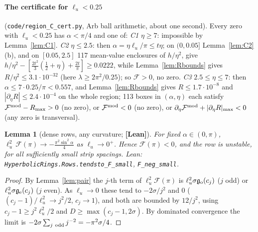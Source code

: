 \documentclass[11pt]{article}
\newtheorem{lemma}[theorem]{Lemma}
\theoremstyle{definition}
\theoremstyle{remark}
\newcommand{\st}[1]{\textbf{[#1]}}
\newcommand{\lean}[1]{\nolinkurl{#1}}
\begin{document}
\paragraph{The certificate for $\ell_u<0.25$} (\nolinkurl{code/region_C_cert.py}, Arb ball arithmetic, about one second). Every zero
with $\ell_u<0.25$ has $\alpha<\pi/4$ and one of: \emph{C1} $\eta\ge7$: impossible by Lemma~\ref{lem:C1}. \emph{C2} $\eta\le2.5$: then
$\alpha=\eta\ell_u/\pi\le t\eta$; on $(0,0.05]$ Lemma~\ref{lem:C2}(b), and on $[0.05,2.5]$ 117 mean-value enclosures of $h/\eta^2$, give
$h/\eta^2-[\frac{2t^2}3(\frac12+\eta)+\frac{2t}\pi]\ge0.0222$, while Lemma~\ref{lem:Rbounds} gives $R/\eta^2\le3.1\cdot10^{-32}$ (here
$\lambda\ge2\pi^2/0.25$); so $\mathcal F>0$, no zero. \emph{C3} $2.5\le\eta\le7$: then $\alpha\le7\cdot0.25/\pi<0.557$, and
Lemma~\ref{lem:Rbounds} gives $R\le1.7\cdot10^{-8}$ and $|\partial_\eta R|\le2.4\cdot10^{-4}$ on the whole region; 113 boxes in
$(\alpha,\eta)$ each satisfy $\mathcal F^{\rm mod}-R_{\max}>0$ (no zero), or $\mathcal F^{\rm mod}<0$ (no zero), or
$\partial_\eta\mathcal F^{\rm mod}+|\partial_\eta R|_{\max}<0$ (any zero is transversal).

\begin{lemma}[dense rows, any curvature; \st{Lean}]\label{lem:small}
For fixed $\alpha\in(0,\pi)$, $\ell_u^2\,\mathcal F(\pi)\to-\frac{\pi^2\sin^2\alpha}4$ as $\ell_u\to0^+$. Hence $\mathcal F(\pi)<0$, and the row is
unstable, for all sufficiently small strip spacings. Lean: \lean{HyperbolicRings.Rows.tendsto_F_small}, \lean{F_neg_small}.
\end{lemma}
\begin{proof}
By Lemma~\ref{lem:pair} the $j$-th term of $\ell_u^2\mathcal F(\pi)$ is $\ell_u^2\sigma\mathfrak g_{\rm o}(c_j)$ ($j$ odd) or $\ell_u^2\sigma\mathfrak g_{\rm e}(c_j)$ ($j$
even). As $\ell_u\to0$ these tend to $-2\sigma/j^2$ and $0$ ($(c_j-1)/\ell_u^2\to j^2/2$, $c_j\to1$), and both are bounded by $12/j^2$, using
$c_j-1\ge j^2\ell_u^2/2$ and $D\ge\max(c_j-1,2\sigma)$. By dominated convergence the limit is $-2\sigma\sum_{j\ \rm odd}j^{-2}=-\pi^2\sigma/4$.
\end{proof}



\end{document}

